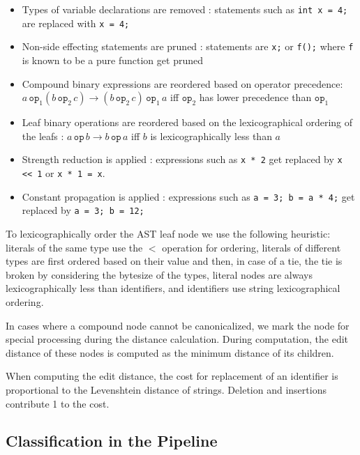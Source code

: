 \documentclass[nocopyrightspace]{sigchi}
\begin{document}
\begin{itemize}
  \item Types of variable declarations are removed : statements such as {\tt int x = 4;}
  are replaced with {\tt x = 4;}
  \item Non-side effecting statements are pruned : statements are {\tt x;} or {\tt f();} where
  {\tt f} is known to be a pure function get pruned
  \item Compound binary expressions are reordered based on operator precedence:
  $a \, \mathtt{op}_1  (b \, \mathtt{op}_2 \, c) \rightarrow (b \, \mathtt{op}_2 \, c) \, \mathtt{op}_1 \, a$
  iff $\mathtt{op}_2$ has lower precedence than $\mathtt{op}_1$
  \item Leaf binary operations are reordered based on the lexicographical ordering
  of the leafs :
  $a \, \mathtt{op} \, b \rightarrow b \, \mathtt{op} \, a$ iff $b$ is lexicographically less than $a$
  \item Strength reduction is applied : expressions such as {\tt x * 2} get replaced by {\tt x << 1} or
  {\tt x * 1 = x}.
  \item Constant propagation is applied : expressions such as {\tt a = 3; b = a * 4;} get replaced
  by {\tt a = 3; b = 12;}
\end{itemize}

To lexicographically order the AST leaf node we use the following heuristic:
literals of the same type use the $<$ operation for ordering,
literals of different types are first ordered based on their value and then,
in case of a tie, the tie is broken by considering the bytesize of the types,
literal nodes are always lexicographically less than identifiers,
and identifiers use string lexicographical ordering.

In cases where a compound node cannot be canonicalized, we mark the node for
special processing during the distance calculation. During computation, the edit
distance of these nodes is computed as the minimum distance of its children.

When computing the edit distance, the cost for replacement of an identifier is
proportional to the Levenshtein distance of strings. Deletion and insertions
contribute 1 to the cost.



\subsection{Classification in the Pipeline}
\end{document}
